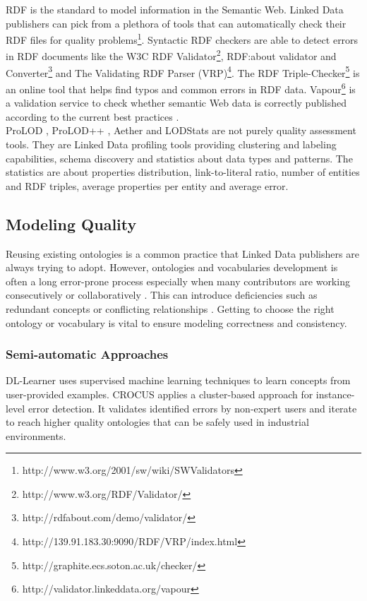 \documentclass[onecolumn, crcready]{iosart2c}
\begin{document}
RDF is the standard to model information in the Semantic Web. Linked Data publishers can pick from a plethora of tools that can automatically check their RDF files for quality problems\footnote{http://www.w3.org/2001/sw/wiki/SWValidators}. Syntactic RDF checkers are able to detect errors in RDF documents like the W3C RDF Validator\footnote{http://www.w3.org/RDF/Validator/}, RDF:about validator and Converter\footnote{http://rdfabout.com/demo/validator/} and The Validating RDF Parser (VRP)\footnote{http://139.91.183.30:9090/RDF/VRP/index.html}. The RDF Triple-Checker\footnote{http://graphite.ecs.soton.ac.uk/checker/} is an online tool that helps find typos and common errors in RDF data. Vapour\footnote{http://validator.linkeddata.org/vapour} \cite{Berrueta08cookinghttp} is a validation service to check whether semantic Web data is correctly published according to the current best practices \cite{tim:linkedata}.\\
ProLOD \cite{Bohm2010}, ProLOD++ \cite{6816740}, Aether \cite{makela-aether-2014} and LODStats \cite{demter-2012-ekaw} are not purely quality assessment tools. They are Linked Data profiling tools providing clustering and labeling capabilities, schema discovery and statistics about data types and patterns. The statistics are about properties distribution, link-to-literal ratio, number of entities and RDF triples, average properties per entity and average error.

\subsection{Modeling Quality}

Reusing existing ontologies is a common practice that Linked Data publishers are always trying to adopt. However, ontologies and vocabularies development is often a long error-prone process especially when many contributors are working consecutively or collaboratively \cite{Suominen2013}. This can introduce deficiencies such as redundant concepts or conflicting relationships \cite{harpring_introduction_2010}. Getting to choose the right ontology or vocabulary is vital to ensure modeling correctness and consistency.\\

\subsubsection{Semi-automatic Approaches}

DL-Learner \cite{Lehmann_dl-learner:learning} uses supervised machine learning techniques to learn concepts from user-provided examples. CROCUS \cite{wasabi_crocus} applies a cluster-based approach for instance-level error detection. It validates identified errors by non-expert users and iterate to reach higher quality ontologies that can be safely used in industrial environments.
\end{document}
